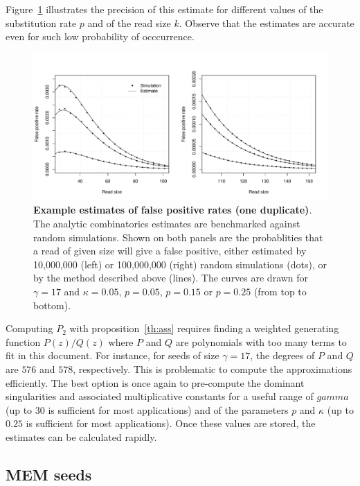 \documentclass{article}
\begin{document}
Figure~\ref{fig:simulp_fp} illustrates the precision of this estimate for
different values of the substitution rate $p$ and of the read size $k$.
Observe that the estimates are accurate even for such low probability of
occcurrence.


\begin{figure}[h]
\centering
\includegraphics[scale=0.445]{simulp_false_positives.pdf}
\caption{\textbf{Example estimates of false positive rates (one
duplicate)}. The analytic combinatorics estimates are benchmarked against
random simulations. Shown on both panels are the probablities that a read
of given size will give a false positive, either estimated by 10,000,000
(left) or 100,000,000 (right) random simulations (dots), or by the method
described above (lines). The curves are drawn for $\gamma=17$ and
$\kappa=0.05$, $p=0.05$, $p=0.15$ or $p=0.25$ (from top to bottom).}
\label{fig:simulp_fp}
\end{figure}

Computing $P_2$ with proposition~\ref{th:ass} requires finding a weighted
generating function $P(z)/Q(z)$ where $P$ and $Q$ are polynomials with too
many terms to fit in this document. For instance, for seeds of size
$\gamma=17$, the degrees of $P$ and $Q$ are $576$ and $578$, respectively.
This is problematic to compute the approximations efficiently. The best
option is once again to pre-compute the dominant singularities and
associated multiplicative constants for a useful range of $gamma$ (up to
$30$ is sufficient for most applications) and of the parameters $p$ and
$\kappa$ (up to $0.25$ is sufficient for most applications). Once these
values are stored, the estimates can be calculated rapidly.



\subsection{MEM seeds}
\end{document}
